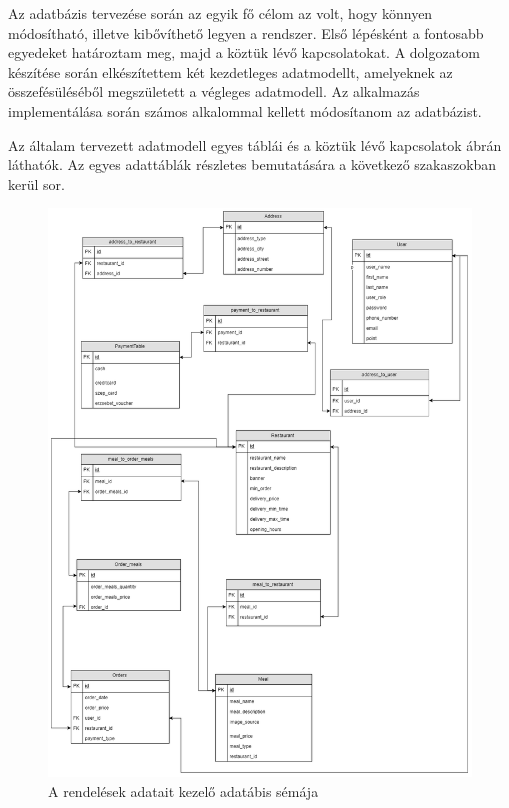
Az adatbázis tervezése során az egyik fő célom az volt, hogy könnyen módosítható, illetve kibővíthető legyen a rendszer. Első lépésként a fontosabb egyedeket határoztam meg, majd a köztük lévő kapcsolatokat. A dolgozatom készítése során elkészítettem két kezdetleges adatmodellt, amelyeknek az összefésüléséből megszületett a végleges adatmodell. Az alkalmazás implementálása során számos alkalommal kellett módosítanom az adatbázist.

Az általam tervezett adatmodell egyes táblái és a köztük lévő kapcsolatok  ábrán láthatók. Az egyes adattáblák részletes bemutatására a következő szakaszokban kerül sor.

\begin{figure}
\includegraphics[scale=0.4]{kepek/rendeles_sema.jpg}
\caption{A rendelések adatait kezelő adatábis sémája}
\label{fig:rendeles_sema}
\end{figure}

